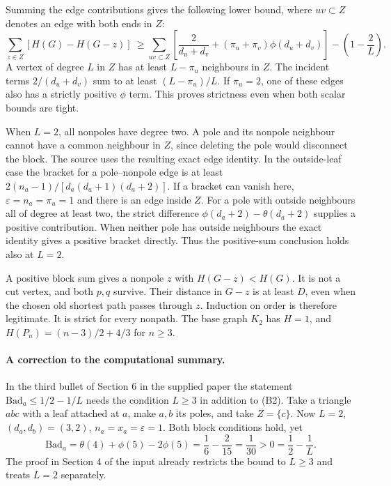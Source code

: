 \documentclass[11pt,a4paper]{article}
\newcommand{\Bad}{\mathrm{Bad}}
\begin{document}
Summing the edge contributions gives the following lower bound, where $uv\subset Z$ denotes an edge with both ends in $Z$:
\[
 \sum_{z\in Z}[H(G)-H(G-z)]\ \ge \sum_{uv\subset Z}\left[\frac2{d_u+d_v}+(\pi_u+\pi_v)\phi(d_u+d_v)\right]
       -\left(1-\frac2L\right).
\]
A vertex of degree $L$ in $Z$ has at least $L-\pi_u$ neighbours in $Z$. The incident terms $2/(d_u+d_v)$ sum to at least $(L-\pi_u)/L$. If $\pi_u=2$, one of these edges also has a strictly positive $\phi$ term. This proves strictness even when both scalar bounds are tight.
 
When $L=2$, all nonpoles have degree two. A pole and its nonpole neighbour cannot have a common neighbour in $Z$, since deleting the pole would disconnect the block. The source uses the resulting exact edge identity. In the outside-leaf case the bracket for a pole--nonpole edge is at least $2(n_a-1)/[d_a(d_a+1)(d_a+2)]$. If a bracket can vanish here, $\varepsilon=n_a=\pi_u=1$ and there is an edge inside $Z$. For a pole with outside neighbours all of degree at least two, the strict difference $\phi(d_a+2)-\theta(d_a+2)$ supplies a positive contribution. When neither pole has outside neighbours the exact identity gives a positive bracket directly. Thus the positive-sum conclusion holds also at $L=2$.
 
A positive block sum gives a nonpole $z$ with $H(G-z)<H(G)$. It is not a cut vertex, and both $p,q$ survive. Their distance in $G-z$ is at least $D$, even when the chosen old shortest path passes through $z$. Induction on order is therefore legitimate. It is strict for every nonpath. The base graph $K_2$ has $H=1$, and $H(P_n)=(n-3)/2+4/3$ for $n\ge3$.
\paragraph{A correction to the computational summary.}
In the third bullet of Section 6 in the supplied paper the statement $\Bad_a\le1/2-1/L$ needs the condition $L\ge3$ in addition to (B2). Take a triangle $abc$ with a leaf attached at $a$, make $a,b$ its poles, and take $Z=\{c\}$. Now $L=2$, $(d_a,d_b)=(3,2)$, $n_a=x_a=\varepsilon=1$. Both block conditions hold, yet
\[
 \Bad_a=\theta(4)+\phi(5)-2\phi(5)=\frac16-\frac{2}{15}=\frac1{30}>0=\frac12-\frac1L.
\]
The proof in Section 4 of the input already restricts the bound to $L\ge3$ and treats $L=2$ separately.
\end{document}
